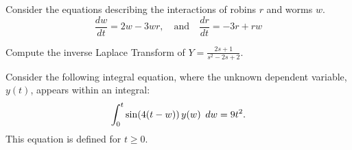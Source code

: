 \documentclass[12pt]{exam}
\begin{document}
    


\newpage


\newpage \InitialsLeft 

\begin{questions}
    \question[3] %
        Consider the equations describing the interactions of robins $r$ and worms $w$.
        $$\frac{dw}{dt} = 2w - 3wr, \quad \text{and} \quad \frac{dr}{dt} = - 3r+rw$$
        
    \question[5] Compute the inverse Laplace Transform of  $\displaystyle Y = \frac{2s+1}{s^2-2s+2}$. %
    
    
    
        
\newpage \InitialsLeft 
    
    \question[6] %
    Consider the following integral equation, where the unknown dependent variable, \(y(t)\), appears within an integral:
    \[\int_0^t \sin\Large(4 (t-w)\Large)\, y(w) \ dw = 9 t^2.\] This equation is defined for \(t \geq 0\).  
\end{questions}
\end{document}
